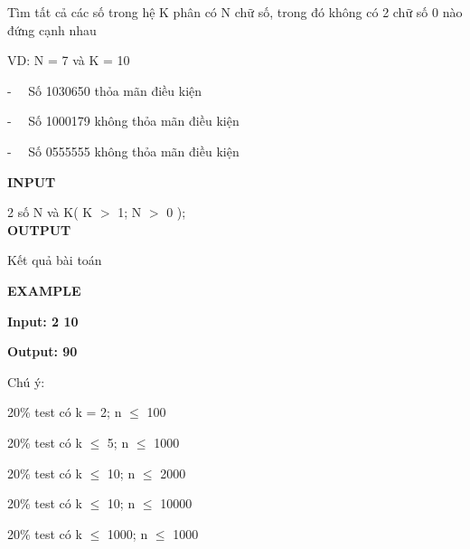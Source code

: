 



    Tìm tất cả các số trong hệ K phân có N chữ số, trong đó không có 2 chữ số 0 nào đứng cạnh nhau   



    VD: N = 7 và K = 10   

    -   Số 1030650 thỏa mãn điều kiện   

    -   Số 1000179 không thỏa mãn điều kiện   

    -   Số 0555555 không thỏa mãn điều kiện   



\textbf{     INPUT    }

    2 số N và K( K $>$ 1; N $>$ 0 );    
\\

\textbf{     OUTPUT    }

    Kết quả bài toán   



\textbf{     EXAMPLE    }

\textbf{      Input: 2 10     }

\textbf{      Output: 90     }



     Chú ý:    

     20\% test có k = 2; n  $\le$  100    

     20\% test có k  $\le$  5; n  $\le$  1000    

     20\% test có k  $\le$  10; n  $\le$  2000    

     20\% test có k  $\le$  10; n  $\le$  10000    

     20\% test có k  $\le$  1000; n  $\le$  1000     
\\
